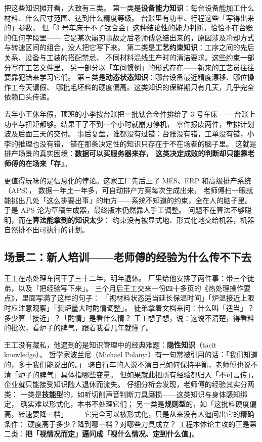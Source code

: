 把这些知识摊开看，大致有三类。
第一类是\textbf{设备能力知识}：每台设备能加工什么材料、什么尺寸范围、达到什么精度等级。
台账里有功率、行程这些「写得出来的」参数，
但「3 号车床干不了钛合金」这种结论性的能力判断，恰恰不在台账的任何字段里——
它是某次崩刃事故之后老师傅总结出来的，原因涉及冷却方式与转速区间的组合，没人把它写下来。
第二类是\textbf{工艺约束知识}：工序之间的先后关系、设备与工装的搭配禁忌、
不同材料混线生产时的清洁要求。这些约束一部分写在工艺文件里，
另一部分以「车间惯例」的形式存在——新来的工艺员往往要靠犯错来学习它们。
第三类是\textbf{动态状态知识}：哪台设备最近精度漂移、哪位操作工今天请假、
哪批毛坯料的硬度偏高。这类知识的保鲜期只有几天，几乎完全依赖口头传递。

去年小王休年假，顶班的小李按台账把一批钛合金件排给了 3 号车床——
台账上功率与扭矩都够。结果干了不到一个小时就崩刃停机，
零件报废两件，重排计划波及后面三天的交付。
事后复盘，谁都没有过错：台账没有错，工单没有错，小李的推理也没有错，
错在那条决定性的知识只存在于不在场者的脑子里。
这就是排产场景的真实困境：\textbf{数据可以买服务器来存，
这类决定成败的判断却只能靠老师傅的在场来「存」}。

更值得玩味的是信息化的悖论。这家工厂先后上了 MES、ERP 和高级排产系统（APS），
数据一年比一年多，可自动排产方案每次生成出来，
老师傅扫一眼就能挑出几处「这么排要出事」的地方——系统不知道的约束，全在人的脑子里。
于是 APS 沦为草稿生成器，最终版本仍然靠人手工调整。
问题不在算法不够聪明，而在\textbf{算法能拿到的知识太少}：
约束没有被显式地、形式化地交给机器，机器自然排不出可执行的计划。

\subsection{场景二：新人培训——老师傅的经验为什么传不下去}

王工在热处理车间干了三十二年，明年退休。
厂里给他安排了两件事：带三个徒弟，以及「把经验写下来」。
三个月后王工交来一份四十多页的《热处理操作要点》，里面写满了这样的句子：
「视材料状态适当延长保温时间」「炉温接近上限时应注意观察」「装炉量大时酌情调整」。
徒弟拿着文档来问：什么叫「适当」？多少算「接近」？「酌情」是看什么情？
王工想了想，说：这说不清楚，得看料的批次，看炉子的脾气，跟着我看几年就懂了。

王工没有藏私，他遇到的是知识管理中的经典难题：\textbf{隐性知识}（tacit knowledge）。
哲学家波兰尼（Michael Polanyi）有一句常被引用的话：「我们知道的，多于我们能说出的。」
骑自行车的人说不清自己如何保持平衡，老师傅也说不清「炉子的脾气」具体指哪些变量。
但如果就此把所有经验都归入「不可言传」，企业就只能接受知识随人退休而流失。
仔细分析会发现，老师傅的经验其实分两类：
一类是\textbf{技能型}的，如听切削声音判断刀具磨损——这类知识与身体感知绑定，
确实难以形式化，本书不处理它们；
另一类是\textbf{规则型}的，如「这批料硬度偏高，转速要降一档」——
它完全可以被形式化，只是从来没有人逼问出它的精确条件：
硬度高于多少？降到哪一档？对哪些刀具成立？
工程本体论主攻的正是第二类：\textbf{把「视情况而定」逼问成「视什么情况、定到什么值」}。

